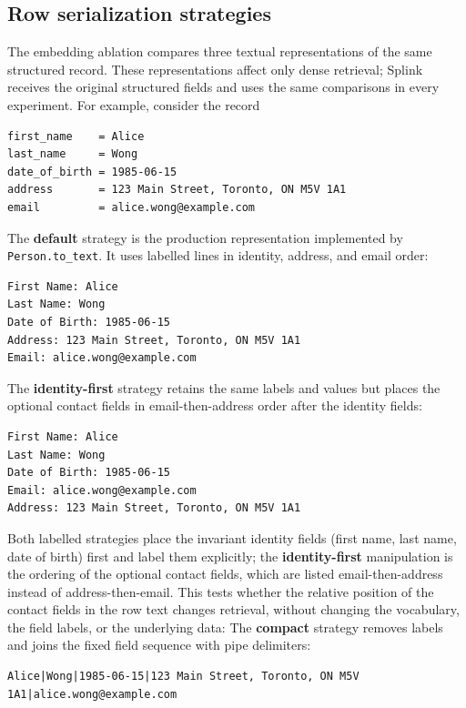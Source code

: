 \documentclass[11pt]{article}
\begin{document}
\subsection{Row serialization strategies}
The embedding ablation compares three textual representations of the same structured record. These representations affect only dense retrieval; Splink receives the original structured fields and uses the same comparisons in every experiment. For example, consider the record

\begin{verbatim}
first_name    = Alice
last_name     = Wong
date_of_birth = 1985-06-15
address       = 123 Main Street, Toronto, ON M5V 1A1
email         = alice.wong@example.com
\end{verbatim}

The \textbf{default} strategy is the production representation implemented by \texttt{Person.to\_text}. It uses labelled lines in identity, address, and email order:

\begin{verbatim}
First Name: Alice
Last Name: Wong
Date of Birth: 1985-06-15
Address: 123 Main Street, Toronto, ON M5V 1A1
Email: alice.wong@example.com
\end{verbatim}

The \textbf{identity-first} strategy retains the same labels and values but places the optional contact fields in email-then-address order after the identity fields:

\begin{verbatim}
First Name: Alice
Last Name: Wong
Date of Birth: 1985-06-15
Email: alice.wong@example.com
Address: 123 Main Street, Toronto, ON M5V 1A1
\end{verbatim}

Both labelled strategies place the invariant identity fields (first name, last name, date of birth) first and label them explicitly; the \textbf{identity-first} manipulation is the ordering of the optional contact fields, which are listed email-then-address instead of address-then-email. This tests whether the relative position of the contact fields in the row text changes retrieval, without changing the vocabulary, the field labels, or the underlying data: The \textbf{compact} strategy removes labels and joins the fixed field sequence with pipe delimiters:

\begin{verbatim}
Alice|Wong|1985-06-15|123 Main Street, Toronto, ON M5V 1A1|alice.wong@example.com
\end{verbatim}
\end{document}
